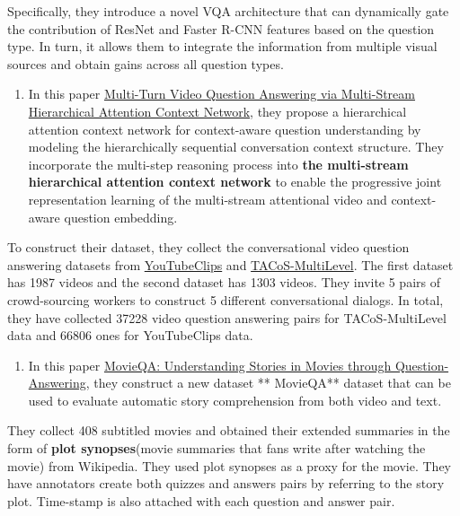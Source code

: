 \documentclass[]{book}
\providecommand{\tightlist}{%
  \setlength{\itemsep}{0pt}\setlength{\parskip}{0pt}}
\theoremstyle{definition}
\theoremstyle{definition}
\theoremstyle{definition}
\theoremstyle{remark}
\begin{document}
Specifically, they introduce a novel VQA architecture that can
dynamically gate the contribution of ResNet and Faster R-CNN features
based on the question type. In turn, it allows them to integrate the
information from multiple visual sources and obtain gains across all
question types.

\begin{enumerate}
\def\labelenumi{\arabic{enumi}.}
\setcounter{enumi}{2}
\tightlist
\item
  In this paper
  \href{https://www.ijcai.org/proceedings/2018/0513.pdf}{Multi-Turn
  Video Question Answering via Multi-Stream Hierarchical Attention
  Context Network}, they propose a hierarchical attention context
  network for context-aware question understanding by modeling the
  hierarchically sequential conversation context structure. They
  incorporate the multi-step reasoning process into \textbf{the
  multi-stream hierarchical attention context network} to enable the
  progressive joint representation learning of the multi-stream
  attentional video and context-aware question embedding.
\end{enumerate}

To construct their dataset, they collect the conversational video
question answering datasets from
\href{http://upplysingaoflun.ecn.purdue.edu/~yu239/}{YouTubeClips} and
\href{https://www.mpi-inf.mpg.de/departments/computer-vision-and-multimodal-computing/research/vision-and-language/tacos-multi-level-corpus/}{TACoS-MultiLevel}.
The first dataset has 1987 videos and the second dataset has 1303
videos. They invite 5 pairs of crowd-sourcing workers to construct 5
different conversational dialogs. In total, they have collected 37228
video question answering pairs for TACoS-MultiLevel data and 66806 ones
for YouTubeClips data.

\begin{enumerate}
\def\labelenumi{\arabic{enumi}.}
\setcounter{enumi}{3}
\tightlist
\item
  In this paper \href{https://arxiv.org/pdf/1512.02902.pdf}{MovieQA:
  Understanding Stories in Movies through Question-Answering}, they
  construct a new dataset ** MovieQA** dataset that can be used to
  evaluate automatic story comprehension from both video and text.
\end{enumerate}

They collect 408 subtitled movies and obtained their extended summaries
in the form of \textbf{plot synopses}(movie summaries that fans write
after watching the movie) from Wikipedia. They used plot synopses as a
proxy for the movie. They have annotators create both quizzes and
answers pairs by referring to the story plot. Time-stamp is also
attached with each question and answer pair.
\end{document}
